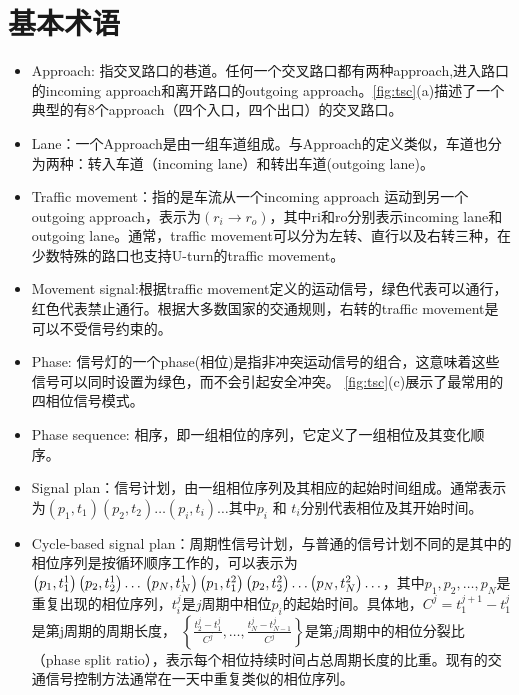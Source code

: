 \section{基本术语}
\begin{itemize}
    \item Approach: 指交叉路口的巷道。任何一个交叉路口都有两种approach,进入路口的incoming approach和离开路口的outgoing approach。\autoref{fig:tsc}(a)描述了一个典型的有8个approach（四个入口，四个出口）的交叉路口。
    \item Lane：一个Approach是由一组车道组成。与Approach的定义类似，车道也分为两种：转入车道（incoming lane）和转出车道(outgoing lane)。
    \item Traffic movement：指的是车流从一个incoming approach 运动到另一个outgoing approach，表示为$\left(r_{i} \longrightarrow r_{o}\right)$，其中ri和ro分别表示incoming lane和outgoing lane。通常，traffic movement可以分为左转、直行以及右转三种，在少数特殊的路口也支持U-turn的traffic movement。
    \item Movement signal:根据traffic movement定义的运动信号，绿色代表可以通行，红色代表禁止通行。根据大多数国家的交通规则，右转的traffic movement是可以不受信号约束的。
    \item Phase: 信号灯的一个phase(相位)是指非冲突运动信号的组合，这意味着这些信号可以同时设置为绿色，而不会引起安全冲突。 \autoref{fig:tsc}(c)展示了最常用的四相位信号模式。
    \item Phase sequence: 相序，即一组相位的序列，它定义了一组相位及其变化顺序。
    \item Signal plan：信号计划，由一组相位序列及其相应的起始时间组成。通常表示为$\left(p_{1}, t_{1}\right)\left(p_{2}, t_{2}\right) \ldots\left(p_{i}, t_{i}\right) \ldots$其中$p_{i}$ 和 $t_{i}$分别代表相位及其开始时间。
    \item Cycle-based signal plan：周期性信号计划，与普通的信号计划不同的是其中的相位序列是按循环顺序工作的，可以表示为
    $\left(p_{1}, t_{1}^{1}\right)\left(p_{2}, t_{2}^{1}\right) \ldots \\ \left(p_{N}, t_{N}^{1}\right)\left(p_{1}, t_{1}^{2}\right)\left(p_{2}, t_{2}^{2}\right) \ldots\left(p_{N}, t_{N}^{2}\right) \ldots$，其中$p_{1}, p_{2}, \ldots, p_{N}$是重复出现的相位序列，$t_i^j$是$j$周期中相位$p_i$的起始时间。具体地，$C^{j}=t_{1}^{j+1}-t_{1}^{j}$是第j周期的周期长度， $\left\{\frac{t_{2}^j-t_{1}^j}{C^j}, \ldots, \frac{t_{N}^j-t_{N-1}^j}{C^j}\right\}$是第$j$周期中的相位分裂比（phase split ratio），表示每个相位持续时间占总周期长度的比重。现有的交通信号控制方法通常在一天中重复类似的相位序列。
\end{itemize}


